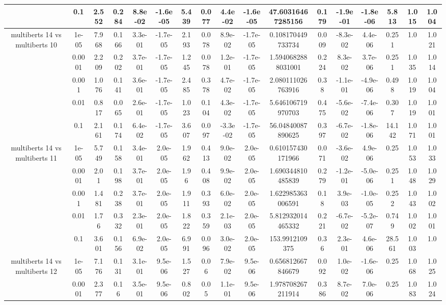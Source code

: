 \begin{tabular}{|c|c|c|c|c|c|c|c|c|c|c|c|c|c|c|c|c|}
 & 0.1 & 2.552 & 0.284 & 8.8e-02 & -1.6e-05 & 5.439 & 0.077 & 4.4e-02 & -1.6e-05 & 47.60316467285156 & 0.179 & -1.9e-01 & -1.8e-06 & 5.813 & 1.015 & 1.004 \\
\hline
\multirow{5}{*}{multiberts 14 vs multiberts 10} & 1e-05 & 7.968 & 0.166 & 3.3e-01 & -1.7e-05 & 2.193 & 0.078 & 8.9e-02 & -1.7e-05 & 0.108170449733734 & 0.009 & -8.3e-02 & 4.4e-06 & 0.251 & 1.0 & 1.021 \\
 & 0.0001 & 2.209 & 0.202 & 3.7e-01 & -1.7e-05 & 1.245 & 0.078 & 1.2e-01 & -1.7e-05 & 1.5940682888031001 & 0.224 & 8.3e-02 & 3.7e-06 & 0.251 & 1.035 & 1.014 \\
 & 0.001 & 1.076 & 0.141 & 3.6e-01 & -1.7e-05 & 2.485 & 0.378 & 4.7e-02 & -1.7e-05 & 2.080111026763916 & 0.38 & -1.1e-01 & -4.9e-06 & 0.498 & 1.019 & 1.004 \\
 & 0.01 & 0.817 & 0.065 & 2.6e-01 & -1.7e-05 & 1.023 & 0.104 & 4.3e-02 & -1.7e-05 & 5.646106719970703 & 0.475 & -5.6e-02 & -7.4e-06 & 0.307 & 1.019 & 1.001 \\
 & 0.1 & 2.161 & 0.174 & 6.4e-02 & -1.7e-05 & 3.607 & 0.097 & -3.3e-02 & -1.7e-05 & 56.04840087890625 & 0.397 & -6.7e-02 & -1.8e-06 & 14.142 & 1.071 & 1.001 \\
\hline
\multirow{5}{*}{multiberts 14 vs multiberts 11} & 1e-05 & 5.749 & 0.158 & 3.4e-01 & 2.0e-05 & 1.962 & 0.413 & 9.0e-02 & 2.0e-05 & 0.610157430171966 & 0.071 & -3.6e-02 & 4.9e-06 & 0.25 & 1.053 & 1.033 \\
 & 0.0001 & 2.01 & 0.198 & 3.7e-01 & 2.0e-05 & 1.96 & 0.408 & 9.9e-02 & 2.0e-05 & 1.690344810485839 & 0.279 & -1.2e-01 & -5.0e-06 & 0.251 & 1.048 & 1.029 \\
 & 0.001 & 1.481 & 0.238 & 3.7e-01 & 2.0e-05 & 1.911 & 0.393 & 6.0e-02 & 2.0e-05 & 1.622985363006591 & 0.18 & 3.9e-03 & -1.0e-05 & 0.252 & 1.043 & 1.002 \\
 & 0.01 & 1.76 & 0.332 & 2.3e-01 & 2.0e-05 & 1.822 & 0.359 & 2.1e-03 & 2.0e-05 & 5.812932014465332 & 0.221 & -6.7e-02 & -5.2e-07 & 0.749 & 1.002 & 1.001 \\
 & 0.1 & 3.601 & 0.156 & 6.9e-02 & 2.0e-05 & 6.991 & 0.096 & 3.0e-02 & 2.0e-05 & 153.9912109375 & 0.36 & 2.3e-01 & 4.6e-06 & 28.561 & 1.003 & 1.0 \\
\hline
\multirow{5}{*}{multiberts 14 vs multiberts 12} & 1e-05 & 7.176 & 0.131 & 3.1e-01 & 9.5e-06 & 1.527 & 0.06 & 7.9e-02 & 9.5e-06 & 0.656812667846679 & 0.092 & 1.0e-02 & -1.6e-06 & 0.25 & 1.068 & 1.025 \\
 & 0.0001 & 2.377 & 0.16 & 3.5e-01 & 9.5e-06 & 0.802 & 0.05 & 1.1e-01 & 9.5e-06 & 1.978708267211914 & 0.386 & 8.7e-02 & 7.0e-06 & 0.25 & 1.083 & 1.024 \\

\end{tabular}

